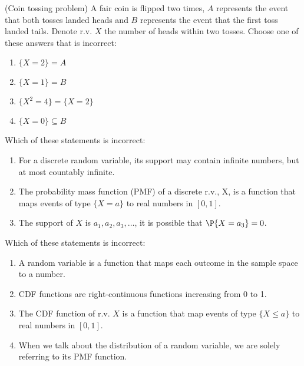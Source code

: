 \documentclass[poll_tutorial_format]{subfiles}
\begin{document}
	
	
	\begin{exercise}
		(Coin tossing problem) A fair coin is flipped two times, $A$ represents the event that both tosses landed heads and $B$ represents the event that the first toss landed tails. Denote r.v. $X$ the number of heads within two tosses.
		Choose one of these answers that is incorrect: 
		\begin{enumerate}
			\item $\{X=2\}=A$
			\item $ \{X=1\}=B$
			\item $\{X^2 =4\} =\{X=2\} $
			\item $ \{X=0\} \subseteq B$
		\end{enumerate}
	\end{exercise}
	
	
	
	\begin{exercise}
			Which of these statements is incorrect:
		\begin{enumerate}
			\item For a discrete random variable, its support may contain infinite numbers, but at most countably infinite.
			\item The probability mass function
			(PMF) of a discrete r.v., X, is a function that maps events of type $\{X=a\}$  to real numbers in $[0,1]$.
			\item The support of $X$ is $a_1, a_2, a_3, \dots$, it is possible that $\P{X=a_{3}}=0$.
		\end{enumerate}
	\end{exercise}
	
	
		\begin{exercise}
		Which of these statements is incorrect:
		\begin{enumerate}
			\item A random variable is a function that maps each outcome in the sample space to a number.  
			\item CDF functions are right-continuous functions increasing from 0 to 1.
			\item The CDF function of r.v. $X$ is a function that map events of type $\{X\leq a\}$ to real numbers in $[0,1]$.
			\item When we talk about the distribution of a random variable, we are solely referring to its PMF function.
		\end{enumerate}
	\end{exercise}
	
 		
		
\end{document}
